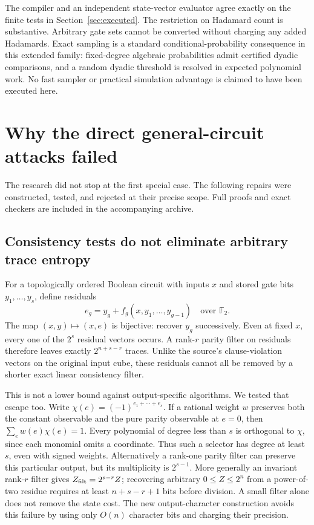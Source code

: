 \documentclass[11pt,a4paper]{article}
\theoremstyle{remark}\newtheorem{remark}[theorem]{Remark}
\newcommand{\F}{\mathbb F}\newcommand{\Q}{\mathbb Q}\newcommand{\Z}{\mathbb Z}
\begin{document}
The compiler and an independent state-vector evaluator agree exactly
on the finite tests in Section~\ref{sec:executed}. The restriction on
Hadamard count is substantive. Arbitrary gate sets cannot be converted
without charging any added Hadamards. Exact sampling is a standard
conditional-probability consequence in this extended family: fixed-degree
algebraic probabilities admit certified dyadic comparisons, and a random
dyadic threshold is resolved in expected polynomial work. No fast sampler
or practical simulation advantage is claimed to have been executed here.

\section{Why the direct general-circuit attacks failed}
The research did not stop at the first special case. The following
repairs were constructed, tested, and rejected at their precise scope.
Full proofs and exact checkers are included in the accompanying archive.

\subsection{Consistency tests do not eliminate arbitrary trace entropy}
For a topologically ordered Boolean circuit with inputs $x$ and stored
gate bits $y_1,\ldots,y_s$, define residuals
\[
 e_g=y_g+f_g(x,y_1,\ldots,y_{g-1})\quad\text{over }\F_2.
\]
The map $(x,y)\mapsto(x,e)$ is bijective: recover $y_g$ successively.
Even at fixed $x$, every one of the $2^s$ residual vectors occurs.
A rank-$r$ parity filter on residuals therefore leaves exactly
$2^{n+s-r}$ traces. Unlike the source's clause-violation vectors on
the original input cube, these residuals cannot all be removed by a
shorter exact linear consistency filter.

This is not a lower bound against output-specific algorithms. We tested
that escape too. Write $\chi(e)=(-1)^{e_1+\cdots+e_s}$. If a rational
weight $w$ preserves both the constant observable and the pure parity
observable at $e=0$, then $\sum_e w(e)\chi(e)=1$. Every polynomial
of degree less than $s$ is orthogonal to $\chi$, since each monomial
omits a coordinate. Thus such a selector has degree at least $s$, even
with signed weights. Alternatively a rank-one parity filter can preserve
this particular output, but its multiplicity is $2^{s-1}$. More generally
an invariant rank-$r$ filter gives $Z_{\rm filt}=2^{s-r}Z$; recovering
arbitrary $0\le Z\le2^n$ from a power-of-two residue requires
at least $n+s-r+1$ bits before division. A small filter alone does not
remove the state cost. The new output-character construction avoids this
failure by using only $O(n)$ character bits and charging their precision.
\end{document}
